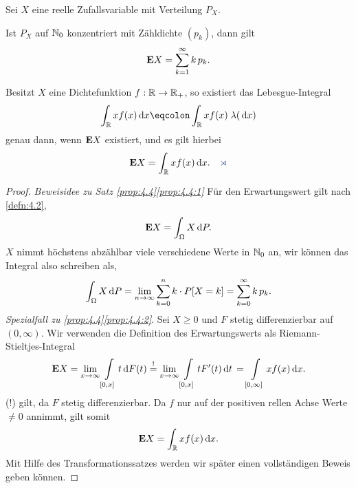 \begin{prop}
\label{prop:4.4}
Sei $X$ eine reelle Zufallsvariable mit Verteilung $P_{X}$.
\begin{propenum}
\item\label{prop:4.4:1}
Ist $P_{X}$ auf $\mathbb{N}_{0}$ konzentriert mit Zähldichte $(p_{k})$, dann gilt
\begin{align*}
\textbf{E} X = \sum\limits_{k=1}^\infty k\,p_{k}.
\end{align*}
\item\label{prop:4.4:2}
Besitzt $X$ eine Dichtefunktion $f: \mathbb{R} \to \mathbb{R}_{+}$, so existiert das
Lebesgue-Integral
\begin{align*}
\int_{\R} xf(x)\dx \defr \int_{\R} xf(x)\; \lambda(\dx)
\end{align*}
genau dann, wenn $\textbf{E} X$ existiert, und es gilt hierbei
\begin{align*}
\E X= \int_{\R} xf(x)\dx.\fishhere
\end{align*}
\end{propenum}
\end{prop}
\begin{proof}
\textit{Beweisidee zu Satz \ref{prop:4.4}\ref{prop:4.4:1}}
Für den Erwartungswert gilt nach \ref{defn:4.2},
\begin{align*}
\textbf{E} X = \int_\Omega X \,\mathrm{d} P.
\end{align*}
$X$ nimmt höchstens abzählbar viele verschiedene Werte in $\mathbb{N}_0$ an, wir können
das Integral also schreiben als,
\begin{align*}
\int_\Omega X \,\mathrm{d} P = \lim\limits_{n\to\infty} \sum\limits_{k=0}^n k\cdot P[X=k]
= \sum\limits_{k=0}^\infty k\, p_k. 
\end{align*}
\textit{Spezialfall zu \ref{prop:4.4}\ref{prop:4.4:2}}. Sei $X\ge 0$ und $F$
stetig differenzierbar auf $(0,\infty)$. Wir verwenden die Definition des
Erwartungswerts als Riemann-Stieltjes-Integral
\begin{align*}
\textbf{E} X = \lim\limits_{x\to\infty} \int\limits_{[0,x]}
t\,\mathrm{d} F(t)
\overset{!}{=} \lim\limits_{x\to\infty} \int\limits_{[0,x]}
t F'(t)\,\mathrm{d} t\, = \int\limits_{[0,\infty]}xf(x)\,\mathrm{d} x.
\end{align*}
(!) gilt, da $F$ stetig differenzierbar. Da $f$ nur auf der positiven rellen
Achse Werte $\neq 0$ annimmt, gilt somit
\begin{align*}
\textbf{E} X = \int_{\mathbb{R}}xf(x)\,\mathrm{d} x.
\end{align*}
Mit Hilfe des Transformationssatzes werden wir später einen vollständigen
Beweis geben können.\qedhere
\end{proof}

